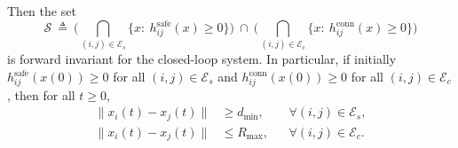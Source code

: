 \begin{theorem}
Then the set
\begin{equation}
\mathcal{S}\ \triangleq\
\Big(\bigcap_{(i,j)\in \mathcal{E}_s} \{x:\ h^{\mathrm{safe}}_{ij}(x)\ge 0\}\Big)
\ \cap\
\Big(\bigcap_{(i,j)\in \mathcal{E}_c} \{x:\ h^{\mathrm{conn}}_{ij}(x)\ge 0\}\Big)
\label{eq:overall_safe_set}
\end{equation}
is forward invariant for the closed-loop system. In particular, if initially
$h^{\mathrm{safe}}_{ij}(x(0))\ge 0$ for all $(i,j)\in\mathcal{E}_s$ and
$h^{\mathrm{conn}}_{ij}(x(0))\ge 0$ for all $(i,j)\in\mathcal{E}_c$,
then for all $t\ge 0$,
\begin{align}
\|x_i(t)-x_j(t)\| &\ge d_{\min}, &&\forall (i,j)\in \mathcal{E}_s,
\label{eq:safety_invariance}\\
\|x_i(t)-x_j(t)\| &\le R_{\max}, &&\forall (i,j)\in \mathcal{E}_c.
\label{eq:conn_invariance}
\end{align}
\end{theorem}


